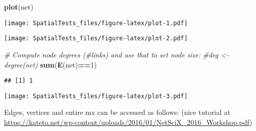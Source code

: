 \documentclass[]{article}
\newenvironment{Shaded}{\begin{snugshade}}{\end{snugshade}}
\newcommand{\CommentTok}[1]{\textcolor[rgb]{0.56,0.35,0.01}{\textit{#1}}}
\newcommand{\DataTypeTok}[1]{\textcolor[rgb]{0.13,0.29,0.53}{#1}}
\newcommand{\DecValTok}[1]{\textcolor[rgb]{0.00,0.00,0.81}{#1}}
\newcommand{\KeywordTok}[1]{\textcolor[rgb]{0.13,0.29,0.53}{\textbf{#1}}}
\newcommand{\NormalTok}[1]{#1}
\newcommand{\OperatorTok}[1]{\textcolor[rgb]{0.81,0.36,0.00}{\textbf{#1}}}
\newcommand{\StringTok}[1]{\textcolor[rgb]{0.31,0.60,0.02}{#1}}
\begin{document}
\begin{Shaded}
\begin{Highlighting}[]
\KeywordTok{plot}\NormalTok{(net) }
\end{Highlighting}
\end{Shaded}

\texttt{[image: SpatialTests\_files/figure-latex/plot-1.pdf]}

\begin{Shaded}
\end{Shaded}

\texttt{[image: SpatialTests\_files/figure-latex/plot-2.pdf]}

\begin{Shaded}
\begin{Highlighting}[]
\CommentTok{# Compute node degrees (#links) and use that to set node size:}
\CommentTok{#deg <- degree(net)}
\KeywordTok{sum}\NormalTok{(}\KeywordTok{E}\NormalTok{(net)}\OperatorTok{==}\DecValTok{1}\NormalTok{)}
\end{Highlighting}
\end{Shaded}

\begin{verbatim}
## [1] 1
\end{verbatim}

\begin{Shaded}
\end{Shaded}

\texttt{[image: SpatialTests\_files/figure-latex/plot-3.pdf]}

Edges, vertices and entire mx can be accessed as follows: (nice tutorial
at
\url{https://kateto.net/wp-content/uploads/2016/01/NetSciX_2016_Workshop.pdf})
\end{document}
